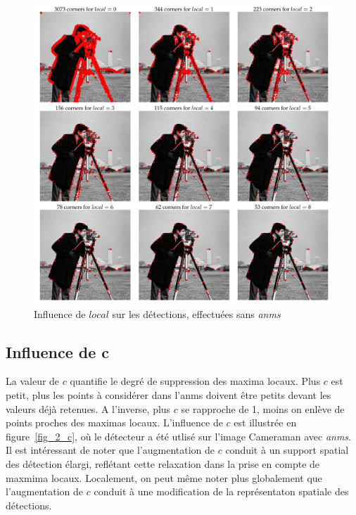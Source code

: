 \documentclass[12pt,a4paper,onecolumn]{article}
\begin{document}
\begin{figure}[H]
	\centering
	\includegraphics[width = 1.0\textwidth]{2_cameraman_local}
	\caption{Influence de \(local\) sur les détections, effectuées sans \textit{anms}}
	\label{fig_2_local}
\end{figure}

\subsection{Influence de c}

La valeur de \(c\) quantifie le degré de suppression des maxima locaux. Plus \(c\) est petit, plus les points à considérer dans l'anms doivent être petits devant les valeurs déjà retenues. A l'inverse, plus \(c\) se rapproche de 1, moins on enlève de points proches des maximas locaux. L'influence de \(c\) est illustrée en figure~\ref{fig_2_c}, où le détecteur a été utlisé sur l'image Cameraman avec \textit{anms}. Il est intéressant de noter que l'augmentation de \(c\) conduit à un support spatial des détection élargi, reflétant cette relaxation dans la prise en compte de maxmima locaux. Localement, on peut même noter plus globalement que l'augmentation de \(c\) conduit à une modification de la représentaton spatiale des détections.
\end{document}
